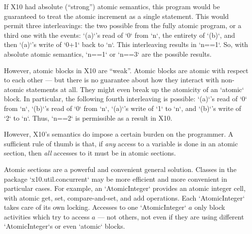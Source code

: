 If X10 had absolute (``strong'') atomic semantics, this program would be guaranteed to
treat the atomic increment as a single statement.  This would permit three
interleavings: the two possible from the fully atomic program, or a third one
with the events:  \xcd`(a)`'s read of \xcd`0` from \xcd`n`, the entirety of
\xcd`(b)`, and then \xcd`(a)`'s write of \xcd`0+1` back to \xcd`n`.  This
interleaving results in \xcd`n==1`. So, with absolute atomic semantics,
\xcd`n==1` or \xcd`n==3` are the possible results.

However, atomic blocks in X10 are ``weak''.  Atomic blocks are atomic
with respect to each other --- but there is no guarantee about how they
interact with non-atomic statements at all.  They might even break up the
atomicity of an \xcd`atomic` block.
In particular, the following
fourth interleaving is possible: \xcd`(a)`'s read of \xcd`0` from \xcd`n`, 
\xcd`(b)`'s read of \xcd`0` from \xcd`n`, \xcd`(a)`'s write of \xcd`1` to
\xcd`n`, and \xcd`(b)`'s write of \xcd`2` to \xcd`n`.   Thus, \xcd`n==2` is
permissible as a result in X10.


However, X10's semantics do impose a certain burden on the programmer.  A
sufficient rule of thumb is that, if {\em any} access to a
variable is done in an atomic section, then {\em all} accesses to it must be
in atomic sections.  

Atomic sections are a powerful and convenient general solution.  Classes in
the package 
\xcd`x10.util.concurrent` may be more efficient and more convenient in
particular cases.  For example, an \xcd`AtomicInteger` provides an atomic
integer cell, with atomic get, set, compare-and-set, and add operations.
Each \xcd`AtomicInteger` takes care of its own locking.  Accesses to one 
\xcd`AtomicInteger` {$a$} only block activities which try to access {$a$} ---
not others, not even if they are using different \xcd`AtomicInteger`s or even
\xcd`atomic` blocks.
